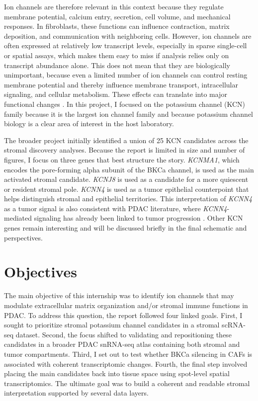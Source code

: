 \documentclass[11pt,a4paper]{article}
\begin{document}
Ion channels are therefore relevant in this context because they regulate membrane potential, calcium entry, secretion, cell volume, and mechanical responses. In fibroblasts, these functions can influence contraction, matrix deposition, and communication with neighboring cells. However, ion channels are often expressed at relatively low transcript levels, especially in sparse single-cell or spatial assays, which makes them easy to miss if analysis relies only on transcript abundance alone. This does not mean that they are biologically unimportant, because even a limited number of ion channels can control resting membrane potential and thereby influence membrane transport, intracellular signaling, and cellular metabolism. These effects can translate into major functional changes \citep{scruggs2020,jiang2019}. In this project, I focused on the potassium channel (KCN) family because it is the largest ion channel family and because potassium channel biology is a clear area of interest in the host laboratory.

The broader project initially identified a union of 25 KCN candidates across the stromal discovery analyses. Because the report is limited in size and number of figures, I focus on three genes that best structure the story. \textit{KCNMA1}, which encodes the pore-forming alpha subunit of the BKCa channel, is used as the main activated stromal candidate. \textit{KCNJ8} is used as a candidate for a more quiescent or resident stromal pole. \textit{KCNN4} is used as a tumor epithelial counterpoint that helps distinguish stromal and epithelial territories. This interpretation of \textit{KCNN4} as a tumor signal is also consistent with PDAC literature, where \textit{KCNN4}-mediated signaling has already been linked to tumor progression \citep{jiang2019}. Other KCN genes remain interesting and will be discussed briefly in the final schematic and perspectives.

\section{Objectives}
The main objective of this internship was to identify ion channels that may modulate extracellular matrix organization and/or stromal immune functions in PDAC. To address this question, the report followed four linked goals. First, I sought to prioritize stromal potassium channel candidates in a stromal scRNA-seq dataset. Second, the focus shifted to validating and repositioning these candidates in a broader PDAC snRNA-seq atlas containing both stromal and tumor compartments. Third, I set out to test whether BKCa silencing in CAFs is associated with coherent transcriptomic changes. Fourth, the final step involved placing the main candidates back into tissue space using spot-level spatial transcriptomics. The ultimate goal was to build a coherent and readable stromal interpretation supported by several data layers.
\end{document}
